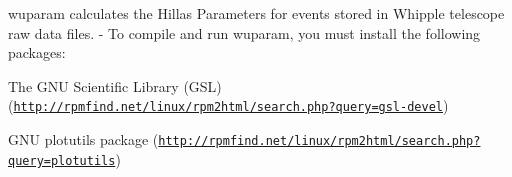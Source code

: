 wuparam calculates the Hillas Parameters for events stored in Whipple telescope raw data files. -\/ To compile and run wuparam, you must install the following packages:
\begin{DoxyEnumerate}
\item The GNU Scientific Library (GSL) (\href{http://rpmfind.net/linux/rpm2html/search.php?query=gsl-devel}{\tt http://rpmfind.net/linux/rpm2html/search.php?query=gsl-\/devel})
\item GNU plotutils package (\href{http://rpmfind.net/linux/rpm2html/search.php?query=plotutils}{\tt http://rpmfind.net/linux/rpm2html/search.php?query=plotutils}) 
\end{DoxyEnumerate}